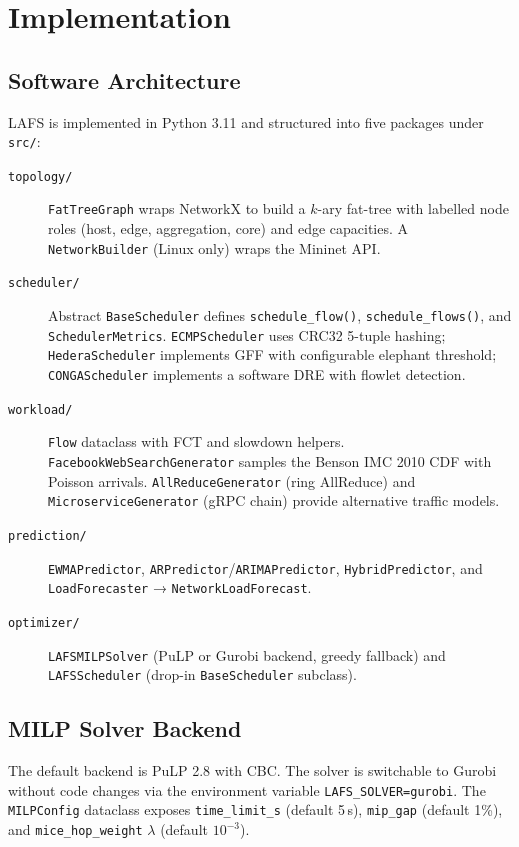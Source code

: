 \documentclass[runningheads]{llncs}
\begin{document}
\section{Implementation}
\label{sec:implementation}

\subsection{Software Architecture}

LAFS is implemented in Python 3.11 and structured into five packages under \texttt{src/}:

\begin{description}
  \item[\texttt{topology/}] \texttt{FatTreeGraph} wraps NetworkX to build a $k$-ary fat-tree with labelled node roles (host, edge, aggregation, core) and edge capacities. A \texttt{NetworkBuilder} (Linux only) wraps the Mininet API.
  \item[\texttt{scheduler/}] Abstract \texttt{BaseScheduler} defines \texttt{schedule\_flow()}, \texttt{schedule\_flows()}, and \texttt{SchedulerMetrics}. \texttt{ECMPScheduler} uses CRC32 5-tuple hashing; \texttt{HederaScheduler} implements GFF with configurable elephant threshold; \texttt{CONGAScheduler} implements a software DRE with flowlet detection.
  \item[\texttt{workload/}] \texttt{Flow} dataclass with FCT and slowdown helpers. \texttt{FacebookWebSearchGenerator} samples the Benson IMC 2010 CDF with Poisson arrivals. \texttt{AllReduceGenerator} (ring AllReduce) and \texttt{MicroserviceGenerator} (gRPC chain) provide alternative traffic models.
  \item[\texttt{prediction/}] \texttt{EWMAPredictor}, \texttt{ARPredictor}/\texttt{ARIMAPredictor}, \texttt{HybridPredictor}, and \texttt{LoadForecaster} → \texttt{NetworkLoadForecast}.
  \item[\texttt{optimizer/}] \texttt{LAFSMILPSolver} (PuLP or Gurobi backend, greedy fallback) and \texttt{LAFSScheduler} (drop-in \texttt{BaseScheduler} subclass).
\end{description}

\subsection{MILP Solver Backend}

The default backend is PuLP 2.8 with CBC. The solver is switchable to Gurobi without code changes via the environment variable \texttt{LAFS\_SOLVER=gurobi}. The \texttt{MILPConfig} dataclass exposes \texttt{time\_limit\_s} (default 5\,s), \texttt{mip\_gap} (default 1\%), and \texttt{mice\_hop\_weight} $\lambda$ (default $10^{-3}$).
\end{document}

